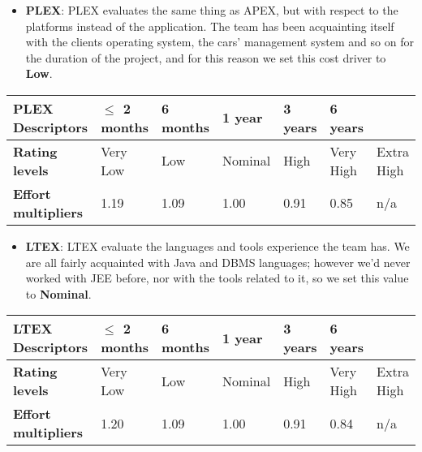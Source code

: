 		
		
		
		\begin{itemize}
			\item \textbf{PLEX}: PLEX evaluates the same thing as APEX, but with respect to the platforms instead of the application. The team has been acquainting itself with the clients operating system, the cars' management system and so on for the duration of the project, and for this reason we set this cost driver to \textbf{Low}.
		\end{itemize}
		
		\begin{center}
			\begin{tabular}{ | C{2cm} | C{2cm} | C{2cm} | C{2cm} | C{2cm} | C{2cm} | C{2cm} | }
				\hline
				\textbf{PLEX Descriptors} & $\leq$ 2 months & 6 months & 1 year & 3 years & 6 years & \\ \hline
			
				\textbf{Rating levels} & Very Low & Low & Nominal & High & Very High & Extra High\\ \hline
			
				\textbf{Effort multipliers} & 1.19 & 1.09 & 1.00 & 0.91 & 0.85 & n/a\\ \hline
			\end{tabular}
		\end{center}
		
		
		
		
		\begin{itemize}
			\item \textbf{LTEX}: LTEX evaluate the languages and tools experience the team has. We are all fairly acquainted with Java and DBMS languages; however we'd never worked with JEE before, nor with the tools related to it, so we set this value to \textbf{Nominal}.
		\end{itemize}
		
		\begin{center}
			\begin{tabular}{ | C{2cm} | C{2cm} | C{2cm} | C{2cm} | C{2cm} | C{2cm} | C{2cm} | }
				\hline
				\textbf{LTEX Descriptors} & $\leq$ 2 months & 6 months & 1 year & 3 years & 6 years & \\ \hline
			
				\textbf{Rating levels} & Very Low & Low & Nominal & High & Very High & Extra High\\ \hline
			
				\textbf{Effort multipliers} & 1.20 & 1.09 & 1.00 & 0.91 & 0.84 & n/a\\ \hline
			\end{tabular}
		\end{center}
		
